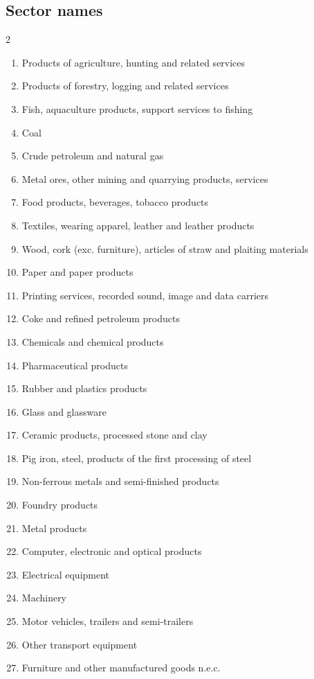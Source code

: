 \documentclass{article}
\begin{document}
\subsection*{Sector names}
\begin{multicols}{2}
\begin{enumerate}[leftmargin=*,itemsep=0pt,parsep=0pt]
\item Products of agriculture, hunting and related services
\item Products of forestry, logging and related services
\item Fish, aquaculture products, support services to fishing
\item Coal
\item Crude petroleum and natural gas
\item Metal ores, other mining and quarrying products, services
\item Food products, beverages, tobacco products
\item Textiles, wearing apparel, leather and leather products
\item Wood, cork (exc. furniture), articles of straw and plaiting materials
\item Paper and paper products
\item Printing services, recorded sound, image and data carriers
\item Coke and refined petroleum products
\item Chemicals and chemical products
\item Pharmaceutical products
\item Rubber and plastics products
\item Glass and glassware
\item Ceramic products, processed stone and clay
\item Pig iron, steel, products of the first processing of steel
\item Non-ferrous metals and semi-finished products
\item Foundry products
\item Metal products
\item Computer, electronic and optical products
\item Electrical equipment
\item Machinery
\item Motor vehicles, trailers and semi-trailers
\item Other transport equipment
\item Furniture and other manufactured goods n.e.c.

\end{enumerate}
\end{multicols}
\end{document}
